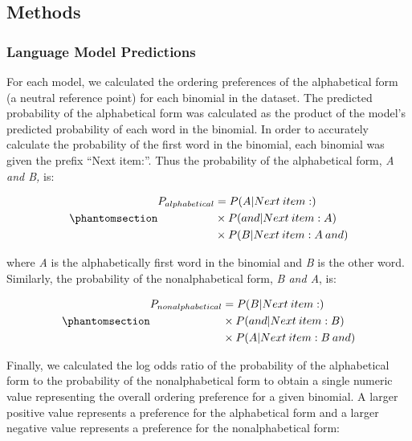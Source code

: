 \documentclass[
  nottoc]{article}
\begin{document}
\subsection{Methods}\label{methods}

\subsubsection{Language Model
Predictions}\label{language-model-predictions}

For each model, we calculated the ordering preferences of the
alphabetical form (a neutral reference point) for each binomial in the
dataset. The predicted probability of the alphabetical form was
calculated as the product of the model's predicted probability of each
word in the binomial. In order to accurately calculate the probability
of the first word in the binomial, each binomial was given the prefix
``Next item:''. Thus the probability of the alphabetical form, \emph{A
and B,} is:

\begin{equation}\phantomsection\label{eq-probalpha}{
\begin{aligned}
P_{alphabetical} & = P(A|Next\:item: )\\      & \times P(and|Next\:item: A)\\      & \times P(B|Next\:item: A\: and)
\end{aligned}
}\end{equation}

\noindent where \emph{A} is the alphabetically first word in the
binomial and \emph{B} is the other word. Similarly, the probability of
the nonalphabetical form, \emph{B and A}, is:

\begin{equation}\phantomsection\label{eq-probnonalpha}{
\begin{aligned}    
P_{nonalphabetical} & = P(B|Next\:item: )\\
& \times P(and|Next\:item: B)\\
& \times P(A|Next\:item: B\: and)
\end{aligned}
}\end{equation}

Finally, we calculated the log odds ratio of the probability of the
alphabetical form to the probability of the nonalphabetical form to
obtain a single numeric value representing the overall ordering
preference for a given binomial. A larger positive value represents a
preference for the alphabetical form and a larger negative value
represents a preference for the nonalphabetical form:
\end{document}

